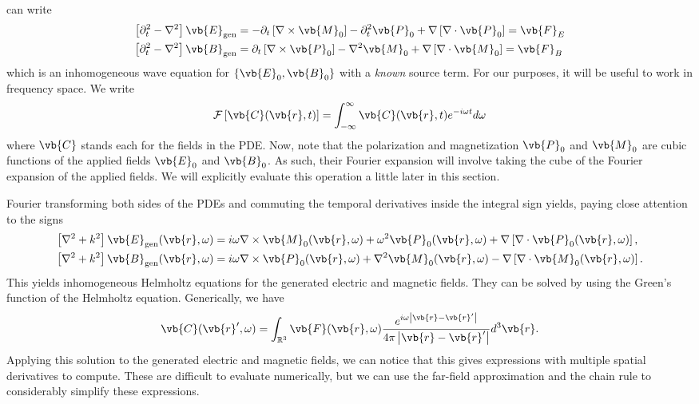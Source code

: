 \documentclass[11pt,SymmetricalJury]{inrsthesis/inrsthesis}
\begin{document}
can write
  \begin{subequations}
  \begin{align}
    \left[\partial_t^2-\nabla^2\right]\vb{E}_\text{gen}
                  &= -\partial_t\left[\nabla\times\vb{M}_0\right]-\partial_t^2\vb{P}_0+\nabla\left[\nabla\cdot\vb{P}_0\right]
                  = \vb{F}_E \\
    \left[\partial_t^2-\nabla^2\right]\vb{B}_\text{gen}
                  &= \partial_t\left[\nabla\times\vb{P}_0\right]-\nabla^2\vb{M}_0+\nabla\left[\nabla\cdot\vb{M}_0\right]=\vb{F}_B
  \end{align}
  \end{subequations}
which is an inhomogeneous wave equation for $\left\{\vb{E}_0,\vb{B}_0\right\}$
with a \textit{known} source term. For our purposes, it will be useful to work
in frequency space. We write
  \begin{equation}
    \mathcal{F}\left[\vb{C}(\vb{r},t)\right] = \int_{-\infty}^\infty \vb{C}(\vb{r},t)e^{-i\omega t}d\omega
  \end{equation}
where $\vb{C}$ stands each for the fields in the PDE. Now, note that the polarization
and magnetization $\vb{P}_0$ and $\vb{M}_0$ are cubic functions of the applied fields
$\vb{E}_0$ and $\vb{B}_0$. As such, their Fourier expansion will involve taking
the cube of the Fourier expansion of the applied fields. We will explicitly evaluate
this operation a little later in this section.

Fourier transforming both sides of the PDEs and commuting the temporal derivatives
inside the integral sign yields, paying close attention to the signs
  \begin{subequations}
  \begin{align}
    \left[\nabla^2+k^2\right]\vb{E}_\text{gen}(\vb{r},\omega)
      &= i\omega\nabla\times\vb{M}_0(\vb{r},\omega) + \omega^2 \vb{P}_0(\vb{r},\omega)+\nabla\left[\nabla\cdot\vb{P}_0(\vb{r},\omega)\right], \\
    \left[\nabla^2+k^2\right]\vb{B}_\text{gen}(\vb{r},\omega)
      &= i\omega\nabla\times\vb{P}_0(\vb{r},\omega) + \nabla^2\vb{M}_0(\vb{r},\omega)-\nabla\left[\nabla\cdot\vb{M}_0(\vb{r},\omega)\right].
  \end{align}
  \end{subequations}
This yields inhomogeneous Helmholtz equations for the generated electric and
magnetic fields. They can be solved by using the Green's function of the
Helmholtz equation. Generically, we have
  \begin{equation}
    \vb{C}(\vb{r}',\omega)
      = \int_{\mathbb{R}^3} \vb{F}(\vb{r},\omega)\frac{e^{i\omega\left|\vb{r}-\vb{r}'\right|}}{4\pi\left|\vb{r}-\vb{r}'\right|}d^3\vb{r}.
  \end{equation}
Applying this solution to the generated electric and magnetic fields, we
can notice that this gives expressions with multiple spatial derivatives
to compute. These are difficult to evaluate numerically, but we can use the
far-field approximation and the chain rule to considerably simplify these
expressions.
\end{document}
